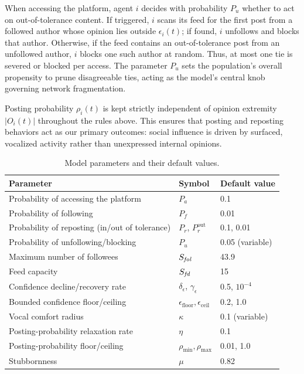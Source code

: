 \documentclass{svproc}
\def\Blue{\color[rgb]{0,0,1}}
\def\Black{\color[rgb]{0,0,0}}
\def\post{\rho}                 %
\def\BoundedConfidence{\epsilon} %
\def\Stubbornness{\mu}           %
\def\maxfollower{S_{\it fol}}    %
\def\maxfeed{S_{\it fd}}         %
\def\VCR{\kappa}                 %
\begin{document}
When accessing the platform, agent $i$ decides with probability $P_u$
whether to act on out-of-tolerance content. If triggered, $i$ scans
its feed for the first post from a followed author whose opinion lies
outside $\BoundedConfidence_i(t)$; if found, $i$ unfollows and blocks
that author. Otherwise, if the feed contains an out-of-tolerance post
from an unfollowed author, $i$ blocks one such author at random. Thus,
at most one tie is severed or blocked per access. The parameter $P_u$
sets the population's overall propensity to prune disagreeable ties,
acting as the model's central knob governing network fragmentation.
\par

Posting probability $\post_i(t)$ is kept strictly independent of
opinion extremity $\vert O_i(t)\vert$ throughout the rules above. This
ensures that posting and reposting behaviors act as our primary
outcomes: social influence is driven by surfaced, vocalized activity
rather than unexpressed internal opinions.
\par


\begin{table}[t]\Blue
\centering
\caption{Model parameters and their default values.}\label{tab:param}
\tabcolsep=5pt
\begin{tabular}{lll}
\toprule
Parameter & Symbol & Default value \\
\midrule
Probability of accessing the platform & $P_a$ & 0.1 \\
Probability of following & $P_f$ & 0.01 \\
Probability of reposting (in/out of tolerance) & $P_r$, $P_r^{\text{out}}$ & 0.1, 0.01 \\
Probability of unfollowing/blocking & $P_u$ & 0.05 (variable) \\
Maximum number of followees & $\maxfollower$ & 43.9 \\
Feed capacity & $\maxfeed$ & 15 \\
Confidence decline/recovery rate & $\delta_{\BoundedConfidence}$, $\gamma_{\BoundedConfidence}$ & 0.5, $10^{-4}$ \\
Bounded confidence floor/ceiling & $\BoundedConfidence_{\mathrm{floor}},\BoundedConfidence_{\mathrm{ceil}}$ & 0.2, 1.0 \\
Vocal comfort radius & $\VCR$ & 0.1 (variable) \\
Posting-probability relaxation rate & $\eta$ & 0.1 \\
Posting-probability floor/ceiling & $\post_{\min},\post_{\max}$ & 0.01, 1.0 \\
Stubbornness & $\Stubbornness$ & 0.82 \\
\bottomrule
\end{tabular}\Black
\end{table}
\end{document}
